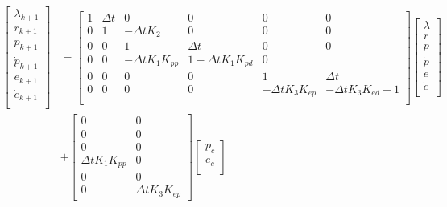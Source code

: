 \documentclass[a4paper, 12pt]{article}\usepackage[utf8]{inputenc}
\begin{document}
\begin{equation}\label{eq:discA}
    \begin{aligned}
        \begin{bmatrix}
            \lambda_{k+1}\\
            r_{k+1}\\
            p_{k+1}\\
            \dot{p}_{k+1}\\
            e_{k+1}\\
            \dot{e}_{k+1}\\
        \end{bmatrix} &= 
        \begin{bmatrix}
            1 & \Delta{t} & 0 & 0 & 0 & 0\\
            0 & 1 & -\Delta{t}K_2 & 0 & 0 & 0\\
            0 & 0 & 1 & \Delta{t} & 0 & 0\\
            0 & 0 & -\Delta{t}K_1K_{pp} & 1-\Delta{t}K_{1}K_{pd} & 0\\
            0 & 0 & 0 & 0 & 1 & \Delta{t}\\
            0 & 0 & 0 & 0 & -\Delta{t}K_3K_{ep} & -\Delta{t}K_3K_{ed}+1\\
        \end{bmatrix} 
        \begin{bmatrix}
            \lambda\\
            r\\
            p\\
            \dot{p}\\
            e\\
            \dot{e}\\
        \end{bmatrix} \\
        &+ \begin{bmatrix}
            0 & 0\\
            0 & 0\\
            0 & 0\\
            \Delta{t} K_1K_{pp} & 0\\
            0 & 0 \\
            0 & \Delta{t}K_3K_{ep}
        \end{bmatrix} 
        \begin{bmatrix}
            p_c\\
            e_c\\
        \end{bmatrix}
    \end{aligned}
\end{equation}
\end{document}
